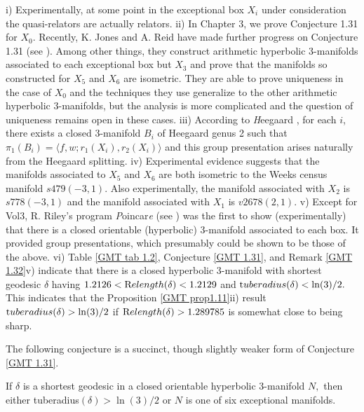 \begin{remarks}
i)
Experimentally, at some point in the exceptional box $X_i$ under consideration the quasi-relators are actually relators. 
ii) In Chapter 3, we prove Conjecture 1.31 for $X_0.$ Recently, K. Jones and A. Reid have made further progress on Conjecture 1.31 (see \cite{JR}).  Among other things, they construct arithmetic hyperbolic $3$-manifolds associated to each exceptional box but $X_3$ and prove that the manifolds so constructed for $X_5$ and $X_6$ are isometric.  They are able to prove uniqueness%
in the case of $X_0$ and
the techniques they use generalize to the other arithmetic hyperbolic $3$-manifolds, but the analysis is more complicated and the question of uniqueness remains open in these cases.
	iii) According to {\textit Heegaard} \cite{Ber}, for each $i$, 
there exists a closed $3$-manifold $B_i$ of Heegaard genus 2 such that $\pi_1(B_i)=\langle f,w;r_1(X_i),r_2(X_i)\rangle $ and
this group presentation arises naturally from the Heegaard splitting.
 iv) Experimental evidence suggests that the manifolds associated to $X_5$ and $X_6$ are both 
isometric to the Weeks census manifold $s479(-3,1).$
Also experimentally, the manifold associated with $X_2$ is $s778(-3,1)$ and the manifold associated with $X_1$ is $v2678(2,1).$
	v) Except for Vol3, R. Riley's program {\textit Poincar{\textrm \'{\textit e}}}  (see \cite{R}) was the first to show (experimentally) that there is a closed orientable (hyperbolic) 
$3$-manifold associated to each box.  It provided group presentations, which presumably could be shown to be those of the above.
	vi)  Table \ref{GMT tab 1.2}, Conjecture \ref{GMT 1.31}, and Remark \ref{GMT 1.32}v) indicate that 
there is a closed hyperbolic $3$-manifold with shortest geodesic $\delta$
having $1.2126 < {\textrm Relength}(\delta) < 1.2129$ and 
${\textrm tuberadius}(\delta) < \ln(3)/2.$
This indicates that the 
	Proposition \ref{GMT prop1.11}ii) result
${\textrm tuberadius}(\delta) > \ln(3)/2$ if ${\textrm Relength}(\delta) > 1.289785$
is somewhat close to being sharp.
\end{remarks}

 The following conjecture is a succinct, though slightly weaker
form of Conjecture \ref{GMT 1.31}.

\begin{conjecture}\label{GMT 1.33}
  If $\delta$ is a shortest geodesic in a closed
orientable hyperbolic $3$\/{\textrm -}\/manifold $N,$ then either 
tuberadius$(\delta) > \ln(3)/2$
or $N$ is one of six exceptional manifolds.
\end{conjecture}

